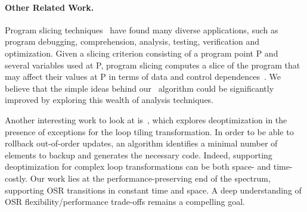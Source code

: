 \paragraph*{Other Related Work.} Program slicing techniques~\cite{Weiser82,Weiser84, Korel88, Agrawal90} have found many diverse applications, such as program debugging, comprehension, analysis, testing, verification and optimization. Given a slicing criterion consisting of a program point P and several variables used at P, program slicing computes a slice of the program that may affect their values at P in terms of data and control dependences~\cite{Tan16}. We believe that the simple ideas behind our \buildcomp\ algorithm could be significantly improved by exploring this wealth of analysis techniques.

Another interesting work to look at is~\cite{Bhandari15}, which explores deoptimization in the presence of exceptions for the loop tiling transformation. In order to be able to rollback out-of-order updates, an algorithm identifies a minimal number of elements to backup and generates the necessary code. Indeed, supporting deoptimization for complex loop transformations can be both space- and time- costly. Our work lies at
the performance-preserving end of the spectrum, supporting OSR transitions in constant time and space. A deep understanding of OSR flexibility/performance trade-offs remains a compelling goal.